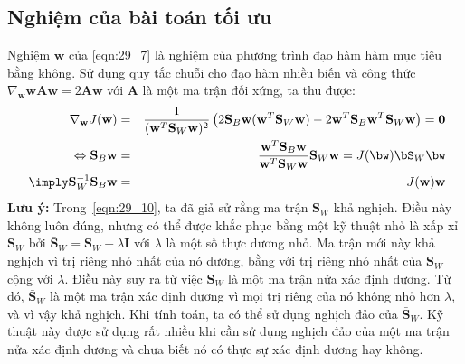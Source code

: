 \subsection{Nghiệm của bài toán tối ưu}
Nghiệm $\mathbf{w}$ của \eqref{eqn:29_7} là nghiệm của phương trình đạo hàm
hàm mục tiêu bằng không. Sử dụng quy tắc chuỗi cho đạo hàm  nhiều biến và công
thức $\nabla_{\mathbf{w}}\mathbf{w} \mathbf{A}\mathbf{w} = 2\mathbf{Aw}$ với
$\mathbf{A}$ là một ma trận đối xứng, ta thu được:
\begin{eqnarray}
\label{eqn:29_8}
\nabla_{\mathbf{w}} J(\mathbf{w}) &=& \frac{1}{(\mathbf{w}^T\mathbf{S}_{W}\mathbf{w})^2} \left(
2\mathbf{S}_B \mathbf{w} (\mathbf{w}^T\mathbf{S}_{W}\mathbf{w}) - 2\mathbf{w}^T\mathbf{S}_{B}\mathbf{w}^T\mathbf{S}_W \mathbf{w}
\right) = \mathbf{0}\\\
\label{eqn:29_9}
\Leftrightarrow \mathbf{S}_B\mathbf{w} &=& \frac{\mathbf{w}^T\mathbf{S}_B
\mathbf{w}}{\mathbf{w}^T\mathbf{S}_W\mathbf{w}}\mathbf{S}_W\mathbf{w} =
J(\bw)\bS_W\bw\\\
\label{eqn:29_10}
\imply \mathbf{S}_W^{-1}\mathbf{S}_B \mathbf{w} &=& J(\mathbf{w})\mathbf{w}
\end{eqnarray}
\textbf{Lưu ý:} Trong~\eqref{eqn:29_10}, ta đã giả sử rằng ma trận
$\mathbf{S}_W$ khả nghịch. Điều này không luôn đúng, nhưng có thể được khắc phục bằng một kỹ
thuật nhỏ là xấp xỉ $\mathbf{S}_W$ bởi $ \bar{\mathbf{S}}_W =
\mathbf{S}_W + \lambda\mathbf{I}$ với $\lambda$ là một số thực dương nhỏ. Ma
trận mới này khả nghịch vì trị riêng nhỏ nhất của nó dương, bằng với trị riêng nhỏ
nhất của $\mathbf{S}_W$ cộng với $\lambda$. Điều
này suy ra từ việc $\mathbf{S}_W$ là một ma trận nửa xác định dương. Từ đó,
$\bar{\mathbf{S}}_W$ là một ma trận xác định dương vì mọi trị riêng của nó không nhỏ hơn $\lambda$, và vì vậy khả nghịch. Khi tính toán, ta có thể sử
dụng nghịch đảo của $\bar{\mathbf{S}}_W$. Kỹ thuật này được sử dụng rất nhiều
khi cần sử dụng nghịch đảo của một ma trận nửa xác định dương và chưa biết nó có
thực sự xác định dương hay không.


